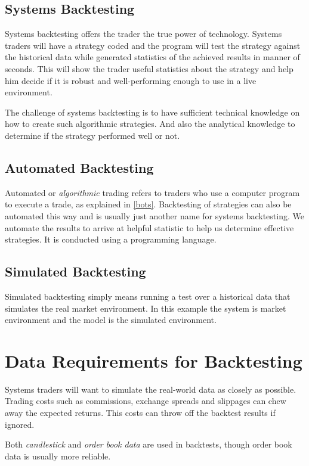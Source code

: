 \subsection*{Systems Backtesting}
Systems backtesting offers the trader the true power of technology. Systems traders will have a strategy coded and the program will test the strategy against the historical data while generated statistics of the achieved results in manner of seconds. This will show the trader useful statistics about the strategy and help him decide if it is robust and well-performing enough to use in a live environment.

The challenge of systems backtesting is to have sufficient technical knowledge on how to create such algorithmic strategies. And also the analytical knowledge to determine if the strategy performed well or not.

\subsection*{Automated Backtesting}
Automated or \emph{algorithmic} trading refers to traders who use a computer program to execute a trade, as explained in \ref{bots}. Backtesting of strategies can also be automated this way and is usually just another name for systems backtesting. We automate the results to arrive at helpful statistic to help us determine effective strategies. It is conducted using a programming language.

\subsection*{Simulated Backtesting}
Simulated backtesting simply means running a test over a historical data that simulates the real market environment. In this example the system is market environment and the model is the simulated environment.


\section{Data Requirements for Backtesting}
Systems traders will want to simulate the real-world data as closely as possible. Trading costs such as commissions, exchange spreads and slippages can chew away the expected returns. This costs can throw off the backtest results if ignored.

Both \emph{candlestick} and \emph{order book data} are used in backtests, though order book data is usually more reliable.

